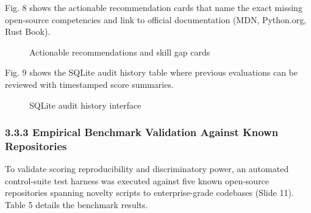 \documentclass[12pt,a4paper]{article}
\begin{document}
\noindent Fig. 8 shows the actionable recommendation cards that name the exact missing open-source competencies and link to official documentation (MDN, Python.org, Rust Book).

\begin{figure}[h!]
\centering
\vspace{0.3cm}
\vspace{0.3cm}
\caption{Actionable recommendations and skill gap cards}
\end{figure}

\newpage
\thispagestyle{fancy}
\noindent Fig. 9 shows the SQLite audit history table where previous evaluations can be reviewed with timestamped score summaries.

\begin{figure}[h!]
\centering
\vspace{0.3cm}
\vspace{0.3cm}
\caption{SQLite audit history interface}
\end{figure}

\subsubsection{3.3.3 Empirical Benchmark Validation Against Known Repositories}
To validate scoring reproducibility and discriminatory power, an automated control-suite test harness was executed against five known open-source repositories spanning novelty scripts to enterprise-grade codebases (Slide 11). Table 5 details the benchmark results.
\end{document}
